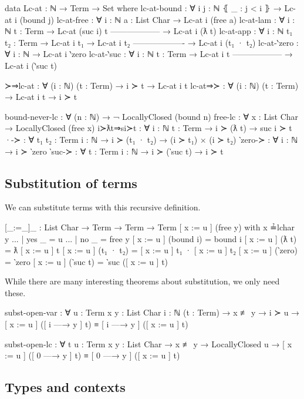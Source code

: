 \documentclass[logo,bsc,singlespacing,parskip,online]{infthesis}
\renewenvironment{code}{\mintedcopy[breaklines,breaksymbolleft=\;]{agda}}{\endmintedcopy}
\begin{document}
\begin{code}
data Lc-at : ℕ → Term → Set where
  lc-at-bound : ∀ {i j : ℕ} ⦃ _ : j < i ⦄ → Lc-at i (bound j)
  lc-at-free : ∀ {i : ℕ} {a : List Char} → Lc-at i (free a)
  lc-at-lam : ∀ {i : ℕ} {t : Term}
    → Lc-at (suc i) t
      ------------------
    → Lc-at i (ƛ t)
  lc-at-app : ∀ {i : ℕ} {t₁ t₂ : Term}
    → Lc-at i t₁
    → Lc-at i t₂
      -------------------
    → Lc-at i (t₁ · t₂)
  lc-at-‵zero : ∀ {i : ℕ} → Lc-at i ‵zero
  lc-at-‵suc : ∀ {i : ℕ} {t : Term}
    → Lc-at i t
      ------------------
    → Lc-at i (‵suc t)

≻⇒lc-at : ∀ (i : ℕ) (t : Term) → i ≻ t → Lc-at i t
lc-at⇒≻ : ∀ (i : ℕ) (t : Term) → Lc-at i t → i ≻ t

bound-never-lc : ∀ (n : ℕ) → ¬ LocallyClosed (bound n)
free-lc : ∀ {x : List Char} → LocallyClosed (free x)
i≻ƛt⇒si≻t : ∀ {i : ℕ} {t : Term} → i ≻ (ƛ t) → suc i ≻ t
·-≻ : ∀ {t₁ t₂ : Term} {i : ℕ} → i ≻ (t₁ · t₂) → (i ≻ t₁) × (i ≻ t₂)
‵zero-≻ : ∀ {i : ℕ} → i ≻ ‵zero
‵suc-≻ : ∀ {t : Term} {i : ℕ} → i ≻ (‵suc t) → i ≻ t
\end{code}

\subsection{Substitution of terms}
We can substitute terms with this recursive definition.

\begin{code}
[_:=_]_ : List Char → Term → Term → Term
[ x := u ] (free y) with x ≟lchar y
... | yes _ = u
... | no  _ = free y
[ x := u ] (bound i) = bound i
[ x := u ] (ƛ t) = ƛ [ x := u ] t
[ x := u ] (t₁ · t₂) = [ x := u ] t₁ · [ x := u ] t₂
[ x := u ] (‵zero) = ‵zero
[ x := u ] (‵suc t) = ‵suc ([ x := u ] t)
\end{code}

While there are many interesting theorems about substitution, we only need these.

\begin{code}
subst-open-var : ∀ {u : Term} {x y : List Char} {i : ℕ} (t : Term)
  → x ≢ y
  → i ≻ u
  → [ x := u ] ([ i —→ y ] t) ≡ [ i —→ y ] ([ x := u ] t)

subst-open-lc : ∀ {t u : Term} {x y : List Char}
  → x ≢ y
  → LocallyClosed u
  → [ x := u ] ([ 0 —→ y ] t) ≡ [ 0 —→ y ] ([ x := u ] t)
\end{code}

\subsection{Types and contexts}
\end{document}
